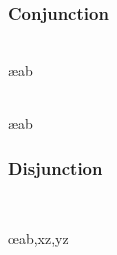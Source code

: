 
\begin{multicols}{2}
\subsubsection*{Conjunction}

\begin{pf}
	 
\end{pf}

\vfill\null
\columnbreak

\begin{pf}
\\	 \ae{ab}

\\	 \ae{ab}
\end{pf}
\end{multicols} %

\vspace{-10pt}
\hrulefill
\vspace{-10pt}
\begin{multicols}{2}
\subsubsection*{Disjunction}

\begin{pf}

\\	
\end{pf}

\vfill\null
\columnbreak


\begin{pf}
	 \oe{ab,xz,yz}
\end{pf}

\end{multicols} %


